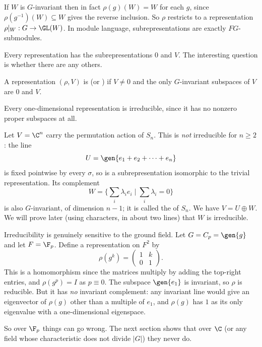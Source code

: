 If $W$ is $G$-invariant then in fact $\rho(g)(W) = W$ for each $g$, since $\rho(g^{-1})(W) \subseteq W$ gives the reverse inclusion. So $\rho$ restricts to a representation $\rho|_W : G \to \GL(W)$. In module language, subrepresentations are exactly $FG$-submodules.

Every representation has the  subrepresentations $0$ and $V$. The interesting question is whether there are any others.

\begin{definition}[Irreducible]
	A representation $(\rho, V)$ is  (or ) if $V \neq 0$ and the only $G$-invariant subspaces of $V$ are $0$ and $V$.
\end{definition}

\begin{example}
	Every one-dimensional representation is irreducible, since it has no nonzero proper subspaces at all.
\end{example}

\begin{example}
	Let $V = \C^n$ carry the permutation action of $S_n$. This is \emph{not} irreducible for $n \geq 2$: the line
	$$U = \gen{e_1 + e_2 + \cdots + e_n}$$
	is fixed pointwise by every $\sigma$, so is a subrepresentation isomorphic to the trivial representation. Its complement
	$$W = \Big\{ \sum_i \lambda_i e_i \; \Big| \; \sum_i \lambda_i = 0 \Big\}$$
	is also $G$-invariant, of dimension $n-1$; it is called the  of $S_n$. We have $V = U \oplus W$. We will prove later (using characters, in about two lines) that $W$ is irreducible.
\end{example}

\begin{example}
	Irreducibility is genuinely sensitive to the ground field. Let $G = C_p = \gen{g}$ and let $F = \F_p$. Define a representation on $F^2$ by
	$$\rho(g^k) = \begin{pmatrix} 1 & k \\ 0 & 1 \end{pmatrix}.$$
	This is a homomorphism since the matrices multiply by adding the top-right entries, and $\rho(g^p) = I$ as $p \equiv 0$. The subspace $\gen{e_1}$ is invariant, so $\rho$ is reducible. But it has \emph{no} invariant complement: any invariant line would give an eigenvector of $\rho(g)$ other than a multiple of $e_1$, and $\rho(g)$ has $1$ as its only eigenvalue with a one-dimensional eigenspace.

	So over $\F_p$ things can go wrong. The next section shows that over $\C$ (or any field whose characteristic does not divide $|G|$) they never do.
\end{example}

